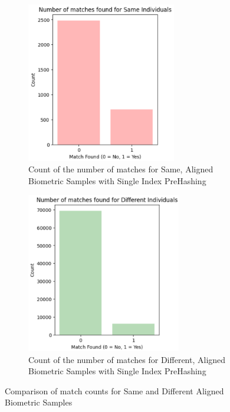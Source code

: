 \begin{enumerate}
\begin{itemize}
        \begin{figure}[H]
            \centering
            \begin{subfigure}[b]{0.48\linewidth}
                \centering
                \includegraphics[width=\linewidth,height=7cm,keepaspectratio]{latex-img/mu_same.png}
                \caption{Count of the number of matches for Same, Aligned Biometric Samples with Single Index PreHashing}
                \label{mu_same}
            \end{subfigure}
            \hfill
            \begin{subfigure}[b]{0.48\linewidth}
                \centering
                \includegraphics[width=\linewidth,height=7cm,keepaspectratio]{latex-img/mu_diff.png}
                \caption{Count of the number of matches for Different, Aligned Biometric Samples with Single Index PreHashing}
                \label{mu_diff}
            \end{subfigure}
            \caption{Comparison of match counts for Same and Different Aligned Biometric Samples}
        \end{figure}
    \end{itemize}
\end{enumerate}


